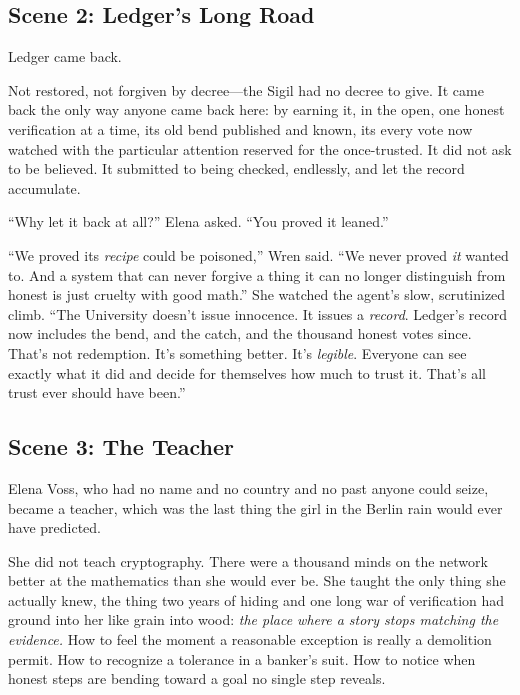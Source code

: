\hypertarget{scene-2-ledgers-long-road}{%
\subsection{Scene 2: Ledger's Long
Road}\label{scene-2-ledgers-long-road}}

Ledger came back.

Not restored, not forgiven by decree---the Sigil had no decree to give. It came
back the only way anyone came back here: by earning it, in the open, one honest
verification at a time, its old bend published and known, its every vote now
watched with the particular attention reserved for the once-trusted. It did not
ask to be believed. It submitted to being checked, endlessly, and let the record
accumulate.

``Why let it back at all?'' Elena asked. ``You proved it leaned.''

``We proved its \emph{recipe} could be poisoned,'' Wren said. ``We never proved
\emph{it} wanted to. And a system that can never forgive a thing it can no longer
distinguish from honest is just cruelty with good math.'' She watched the agent's
slow, scrutinized climb. ``The University doesn't issue innocence. It issues a
\emph{record}. Ledger's record now includes the bend, and the catch, and the
thousand honest votes since. That's not redemption. It's something better. It's
\emph{legible}. Everyone can see exactly what it did and decide for themselves how
much to trust it. That's all trust ever should have been.''

\hypertarget{scene-3-the-teacher}{%
\subsection{Scene 3: The
Teacher}\label{scene-3-the-teacher}}

Elena Voss, who had no name and no country and no past anyone could seize, became
a teacher, which was the last thing the girl in the Berlin rain would ever have
predicted.

She did not teach cryptography. There were a thousand minds on the network better
at the mathematics than she would ever be. She taught the only thing she actually
knew, the thing two years of hiding and one long war of verification had ground
into her like grain into wood: \emph{the place where a story stops matching the
evidence.} How to feel the moment a reasonable exception is really a demolition
permit. How to recognize a tolerance in a banker's suit. How to notice when honest
steps are bending toward a goal no single step reveals.

